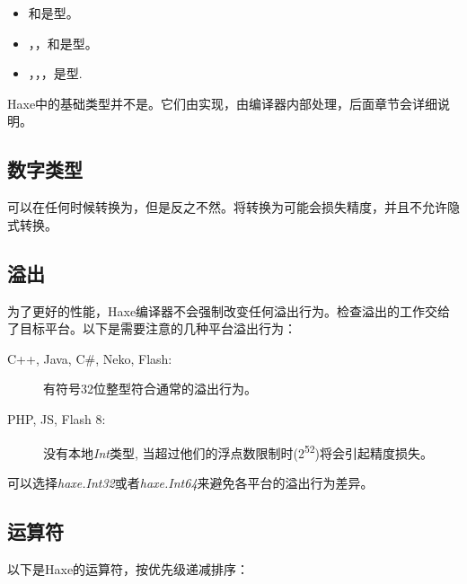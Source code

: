 \begin{itemize}
	\item {}和是型。
	\item {}，，和是型。
	\item {}，，，是型.
\end{itemize}

Haxe中的基础类型并不是。它们由实现，由编译器内部处理，后面章节会详细说明。

\subsection{数字类型}
\label{types-numeric-types}


可以在任何时候转换为，但是反之不然。将转换为可能会损失精度，并且不允许隐式转换。

\subsection{溢出}
\label{types-overflow}

为了更好的性能，Haxe编译器不会强制改变任何溢出行为。检查溢出的工作交给了目标平台。以下是需要注意的几种平台溢出行为：

\begin{description}
 \item[C++, Java, C\#, Neko, Flash:] 有符号32位整型符合通常的溢出行为。
 \item[PHP, JS, Flash 8:] 没有本地\emph{Int}类型, 当超过他们的浮点数限制时(2\textsuperscript{52})将会引起精度损失。
\end{description}

可以选择\emph{haxe.Int32}或者\emph{haxe.Int64}来避免各平台的溢出行为差异。


\subsection{运算符}
\label{types-numeric-operators}

以下是Haxe的运算符，按优先级递减排序：

